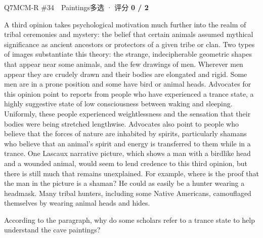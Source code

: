 \begin{qblock}{Q7\quad MCM-R \#34\ \ Paintings}{多选 · 评分 \textcolor{cAccent}{\bfseries 0 / 2}}
\begin{promptbox}
A third opinion takes psychological motivation much further into the realm of tribal ceremonies and mystery: the belief that certain animals assumed mythical significance as ancient ancestors or protectors of a given tribe or clan. Two types of images substantiate this theory: the strange, indecipherable geometric shapes that appear near some animals, and the few drawings of men. Wherever men appear they are crudely drawn and their bodies are elongated and rigid. Some men are in a prone position and some have bird or animal heads. Advocates for this opinion point to reports from people who have experienced a trance state, a highly suggestive state of low consciousness between waking and sleeping. Uniformly, these people experienced weightlessness and the sensation that their bodies were being stretched lengthwise. Advocates also point to people who believe that the forces of nature are inhabited by spirits, particularly shamans who believe that an animal's spirit and energy is transferred to them while in a trance. One Lascaux narrative picture, which shows a man with a birdlike head and a wounded animal, would seem to lend credence to this third opinion, but there is still much that remains unexplained. For example, where is the proof that the man in the picture is a shaman? He could as easily be a hunter wearing a headmask. Many tribal hunters, including some Native Americans, camouflaged themselves by wearing animal heads and hides.
\end{promptbox}
\begin{notebox}According to the paragraph, why do some scholars refer to a trance state to help understand the cave paintings?\end{notebox}

\end{qblock}
